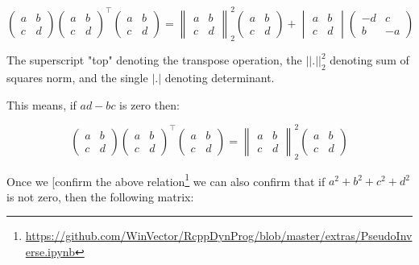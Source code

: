 \documentclass{article}
\begin{document}
\[
\begin{pmatrix} a & b \\ c & d \end{pmatrix}
\begin{pmatrix} a & b \\ c & d \end{pmatrix}^{\top}
\begin{pmatrix} a & b \\ c & d \end{pmatrix}
=
\begin{Vmatrix} a & b \\ c & d \end{Vmatrix}_2^2
\begin{pmatrix} a & b \\ c & d \end{pmatrix} 
+
\begin{vmatrix} a & b \\ c & d \end{vmatrix}
\begin{pmatrix} -d & c \\ b & -a \end{pmatrix} 
\]

The superscript "top" denoting the transpose operation, the $||.||^2_2$ denoting sum of squares norm, and the single $|.|$ denoting determinant.

This means, if $a d - b c$ is zero then:


\[ 
\begin{pmatrix} a & b \\ c & d \end{pmatrix}
\begin{pmatrix} a & b \\ c & d \end{pmatrix}^{\top}
\begin{pmatrix} a & b \\ c & d \end{pmatrix}
=
\begin{Vmatrix} a & b \\ c & d \end{Vmatrix}_2^2
\begin{pmatrix} a & b \\ c & d \end{pmatrix}
\]





Once we [confirm the above relation\footnote{\url{https://github.com/WinVector/RcppDynProg/blob/master/extras/PseudoInverse.ipynb}} we can also confirm that if $a^2 + b^2 + c^2 + d^2$ is not zero, then the following matrix:
\end{document}
